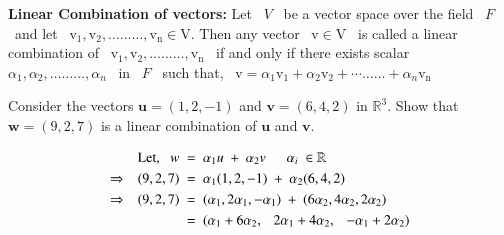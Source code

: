 \documentclass[12pt]{article}
\renewcommand{\vec}[1]{\overrightarrow{#1}}
\begin{document}





\textbf{Linear Combination of vectors:} Let \ $V$ \ be a vector space over the field \ $F$ \ and let \ $\mathrm{v}_1, \mathrm{v}_2, \ldots \ldots \ldots, \mathrm{v}_{\mathrm{n}} \in \mathrm{V}$. Then any vector \ $\mathrm{v} \in \mathrm{V}$ \ is called a linear combination of \ $\mathrm{v}_1, \mathrm{v}_2, \ldots \ldots \ldots, \mathrm{v}_{\mathrm{n}}$ \ if and only if there exists scalar \ $\alpha_1, \alpha_2, \ldots \ldots \ldots, \alpha_n$ \ in \ $F$ \ such that, \ $\mathrm{v}=\alpha_1 \mathrm{v}_1+\alpha_2 \mathrm{v}_2+\cdots \ldots \ldots+\alpha_n \mathrm{v}_{\mathrm{n}}$

\vspace{5ex}
 Consider the vectors $\mathbf{u}=(1,2,-1)$ and $\mathbf{v}=(6,4,2)$ in $\mathbb{R}^3$. Show that $\mathbf{w}=(9,2,7)$ is a linear combination of $\mathbf{u}$ and $\mathbf{v}$.


\vspace{3ex}
\vspace{-3\baselineskip}

\begin{align*}
   \text{Let, \ \ } w \ &=\ \alpha_1 u \ +\ \alpha_2 v \tabs \alpha_i \ \in \mathbb{R}\\
   \Rightarrow \tab (9,2,7) \ &=\ \alpha_1 (1,2,-1) \ +\ \alpha_2 (6,4,2) \\
   \Rightarrow \tab (9,2,7) \ &=\ (\alpha_1,2\alpha_1,-\alpha_1) \ +\ (6\alpha_2,4\alpha_2,2\alpha_2) \\
   \ &=\ (\alpha_1+6\alpha_2, \tab 2\alpha_1+4\alpha_2, \tab -\alpha_1+2\alpha_2) 
\end{align*}
\end{document}
